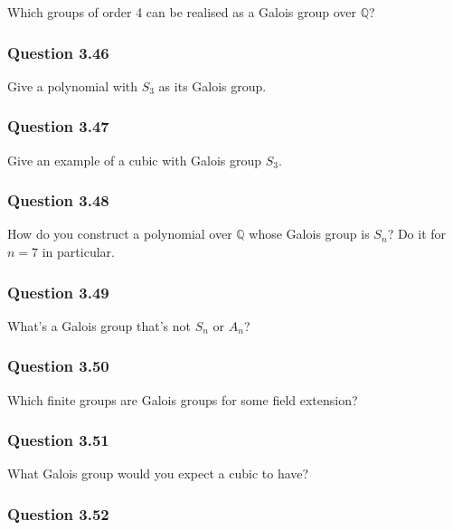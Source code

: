 Which groups of order 4 can be realised as a Galois group over
\({\mathbb{Q}}\)?

\hypertarget{question-3.46}{%
\subsubsection{Question 3.46}\label{question-3.46}}

Give a polynomial with \(S_3\) as its Galois group.

\hypertarget{question-3.47}{%
\subsubsection{Question 3.47}\label{question-3.47}}

Give an example of a cubic with Galois group \(S_3\).

\hypertarget{question-3.48}{%
\subsubsection{Question 3.48}\label{question-3.48}}

How do you construct a polynomial over \({\mathbb{Q}}\) whose Galois
group is \(S_n\)? Do it for \(n = 7\) in particular.

\hypertarget{question-3.49}{%
\subsubsection{Question 3.49}\label{question-3.49}}

What's a Galois group that's not \(S_n\) or \(A_n\)?

\hypertarget{question-3.50}{%
\subsubsection{Question 3.50}\label{question-3.50}}

Which finite groups are Galois groups for some field extension?

\hypertarget{question-3.51}{%
\subsubsection{Question 3.51}\label{question-3.51}}

What Galois group would you expect a cubic to have?

\hypertarget{question-3.52}{%
\subsubsection{Question 3.52}\label{question-3.52}}


